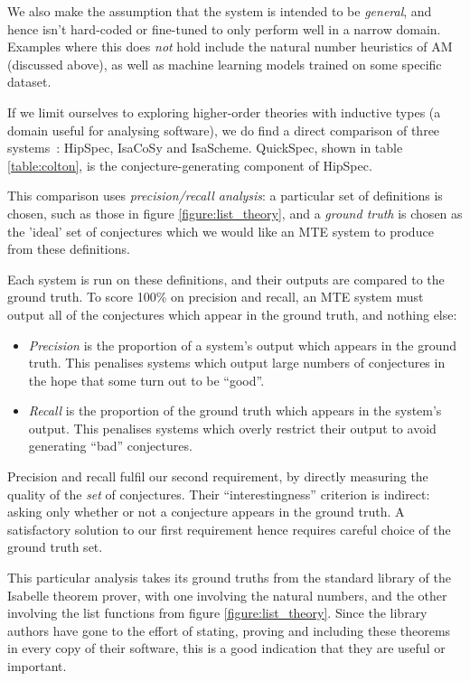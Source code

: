 We also make the assumption that the system is intended to be \emph{general},
and hence isn't hard-coded or fine-tuned to only perform well in a narrow
domain. Examples where this does \emph{not} hold include the natural number
heuristics of AM (discussed above), as well as machine learning models trained
on some specific dataset.

If we limit ourselves to exploring higher-order theories with inductive types
(a domain useful for analysing software), we do find a direct comparison of
three systems~\cite{claessen2013automating}: HipSpec, IsaCoSy and IsaScheme.
QuickSpec, shown in table \ref{table:colton}, is the conjecture-generating
component of HipSpec.

This comparison uses \emph{precision/recall analysis}: a particular set of
definitions is chosen, such as those in figure \ref{figure:list_theory}, and a
\emph{ground truth} is chosen as the 'ideal' set of conjectures which we would
like an MTE system to produce from these definitions.

Each system is run on these definitions, and their outputs are compared to the
ground truth. To score 100\% on precision and recall, an MTE system must output
all of the conjectures which appear in the ground truth, and nothing else:

\begin{itemize}
\item \emph{Precision} is the proportion of a system's output which appears in
  the ground truth. This penalises systems which output large numbers of
  conjectures in the hope that some turn out to be ``good''.
\item \emph{Recall} is the proportion of the ground truth which appears in the
  system's output. This penalises systems which overly restrict their output to
  avoid generating ``bad'' conjectures.
\end{itemize}

Precision and recall fulfil our second requirement, by directly measuring the
quality of the \emph{set} of conjectures. Their ``interestingness'' criterion is
indirect: asking only whether or not a conjecture appears in the ground truth.
A satisfactory solution to our first requirement hence requires careful choice
of the ground truth set.

This particular analysis takes its ground truths from the standard library of
the Isabelle theorem prover, with one involving the natural numbers, and the
other involving the list functions from figure \ref{figure:list_theory}. Since
the library authors have gone to the effort of stating, proving and including
these theorems in every copy of their software, this is a good indication that
they are useful or important.

